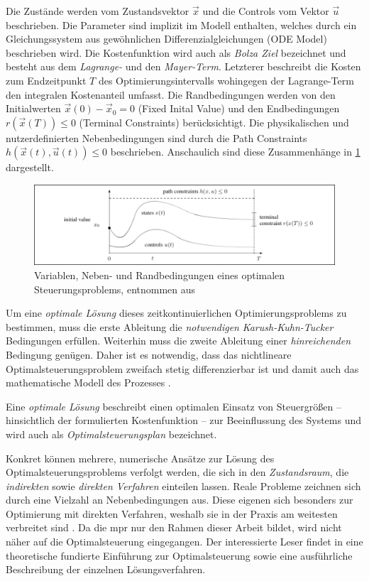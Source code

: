 Die Zustände werden vom Zustandsvektor $\vec{x}$ und die Controls vom Vektor $\vec{u}$ beschrieben. Die Parameter sind implizit im Modell enthalten, welches durch ein Gleichungssystem aus gewöhnlichen Differenzialgleichungen (ODE Model) beschrieben wird. Die Kostenfunktion wird auch als \textit{Bolza Ziel} bezeichnet und besteht aus dem \textit{Lagrange-} und den \textit{Mayer-Term}. Letzterer beschreibt die Kosten zum Endzeitpunkt $T$ des Optimierungsintervalls wohingegen der Lagrange-Term den integralen Kostenanteil umfasst. Die Randbedingungen werden von den Initialwerten $\vec{x}(0)-\vec{x}_{0} = 0$ (Fixed Inital Value) und den Endbedingungen $r(\vec{x}(T)) \leq 0$ (Terminal Constraints) berücksichtigt. Die physikalischen und nutzerdefinierten Nebenbedingungen sind durch die Path Constraints $h(\vec{x}(t),\vec{u}(t)) \leq 0$ beschrieben. Anschaulich sind diese Zusammenhänge in \ref{fig:opt} dargestellt.

\begin{figure}
\centering
\includegraphics[width=\textwidth]{abbildungen/20160327_mpc}
\caption[Variablen, Neben- und Randbedingungen eines optimalen Steuerungsproblems]{Variablen, Neben- und Randbedingungen eines optimalen Steuerungsproblems, entnommen aus \cite[S.61]{di14}}
\label{fig:opt}
\end{figure}

Um eine \textit{optimale Lösung} dieses zeitkontinuierlichen Optimierungsproblems zu bestimmen, muss die erste Ableitung die \textit{notwendigen} \textit{Karush-Kuhn-Tucker} Bedingungen erfüllen. Weiterhin muss die zweite Ableitung einer \textit{hinreichenden} Bedingung genügen. Daher ist es notwendig, dass das nichtlineare Optimalsteuerungsproblem zweifach stetig differenzierbar ist und damit auch das mathematische Modell des Prozesses \cite[S.~21ff.]{di14}.

Eine \textit{optimale Lösung} beschreibt einen optimalen Einsatz von Steuergrößen -- hinsichtlich der formulierten Kostenfunktion -- zur Beeinflussung des Systems und wird auch als \textit{Optimalsteuerungsplan} bezeichnet.

Konkret können mehrere, numerische Ansätze zur Lösung des Optimalsteuerungsproblems verfolgt werden, die sich in den \textit{Zustandsraum}, die \textit{indirekten} sowie \textit{direkten Verfahren} einteilen lassen. Reale Probleme zeichnen sich durch eine Vielzahl an Nebenbedingungen aus. Diese eigenen sich besonders zur Optimierung mit direkten Verfahren, weshalb sie in der Praxis am weitesten verbreitet sind \cite[S.~63]{di14}. 
Da die \acrlong{mpr} nur den Rahmen dieser Arbeit bildet, wird nicht näher auf die Optimalsteuerung eingegangen. Der interessierte Leser findet in \cite{di14} eine theoretische fundierte Einführung zur Optimalsteuerung sowie eine ausführliche Beschreibung der einzelnen Lösungsverfahren.


